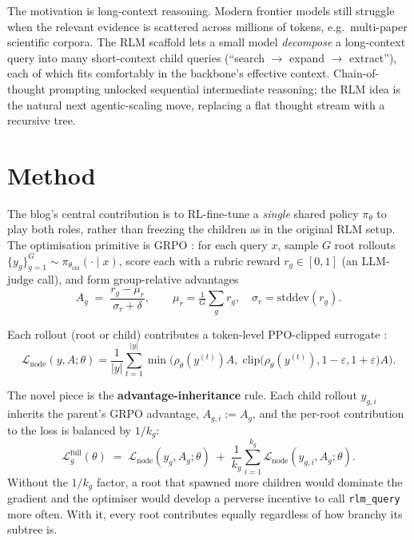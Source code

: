 \documentclass[11pt]{article}
\begin{document}
The motivation is long-context reasoning. Modern frontier models still struggle
when the relevant evidence is scattered across millions of tokens, e.g.\
multi-paper scientific corpora. The RLM scaffold lets a small model
\emph{decompose} a long-context query into many short-context child queries
(``search $\to$ expand $\to$ extract''), each of which fits comfortably in the
backbone's effective context. Chain-of-thought prompting \citep{wei2022cot}
unlocked sequential intermediate reasoning; the RLM idea is the natural next
agentic-scaling move, replacing a flat thought stream with a recursive tree.

\section*{Method}

The blog's central contribution is to RL-fine-tune a \emph{single} shared policy
$\pi_\theta$ to play both roles, rather than freezing the children as in the
original RLM setup. The optimisation primitive is GRPO \citep{shao2024deepseekmath,
deepseek2025r1}: for each query $x$, sample $G$ root rollouts
$\{y_g\}_{g=1}^G \sim \pi_{\theta_{\text{old}}}(\cdot \mid x)$, score each with a
rubric reward $r_g \in [0,1]$ (an LLM-judge call), and form group-relative
advantages
\[
A_g \;=\; \frac{r_g - \mu_r}{\sigma_r + \delta},
\qquad
\mu_r = \tfrac{1}{G}\textstyle\sum_g r_g,
\quad \sigma_r = \mathrm{stddev}(r_g).
\]

Each rollout (root or child) contributes a token-level PPO-clipped surrogate
\citep{schulman2017ppo}:
\begin{equation}
\mathcal{L}_{\text{node}}(y, A; \theta)
= \frac{1}{|y|} \sum_{t=1}^{|y|}
  \min\!\Big(\rho_\theta(y^{(t)}) A,\;
             \mathrm{clip}\!\big(\rho_\theta(y^{(t)}), 1{-}\varepsilon, 1{+}\varepsilon\big) A\Big).
\label{eq:node}
\end{equation}

The novel piece is the \textbf{advantage-inheritance} rule. Each child rollout
$y_{g,i}$ inherits the parent's GRPO advantage, $A_{g,i} := A_g$, and the
per-root contribution to the loss is balanced by $1/k_g$:
\begin{equation}
\mathcal{L}_g^{\text{full}}(\theta)
\;=\; \mathcal{L}_{\text{node}}(y_g, A_g; \theta)
   \;+\; \frac{1}{k_g} \sum_{i=1}^{k_g} \mathcal{L}_{\text{node}}(y_{g,i}, A_g; \theta).
\label{eq:depth1}
\end{equation}
Without the $1/k_g$ factor, a root that spawned more children would dominate
the gradient and the optimiser would develop a perverse incentive to call
\texttt{rlm\_query} more often. With it, every root contributes equally
regardless of how branchy its subtree is.
\end{document}
